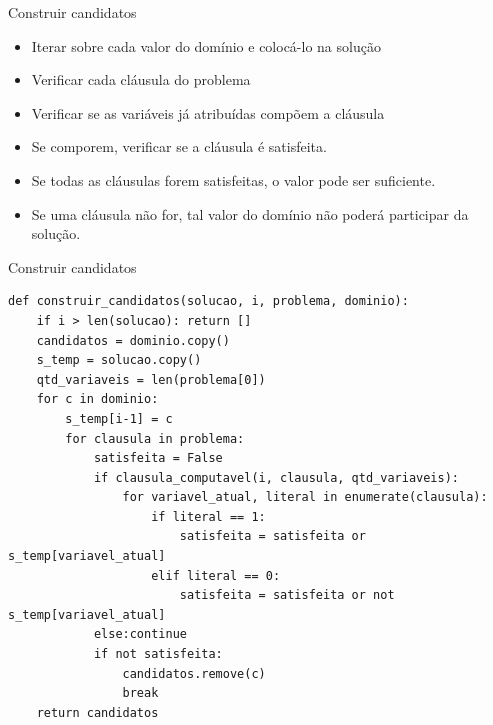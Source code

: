 \documentclass[compress,aspectratio=169]{beamer}
\begin{document}
    \begin{frame}{Construir candidatos}
        \begin{itemize}
            \item Iterar sobre cada valor do domínio e colocá-lo na solução
            \item Verificar cada cláusula do problema
            \item Verificar se as variáveis já atribuídas compõem a cláusula
            \item Se comporem, verificar se a cláusula é satisfeita. 
            \item Se todas as cláusulas forem satisfeitas, o valor pode ser suficiente.
            \item Se uma cláusula não for, tal valor do domínio não poderá participar da solução.
        \end{itemize}
    \end{frame}

    \begin{frame}[fragile]{Construir candidatos}
        \begin{lstlisting}
def construir_candidatos(solucao, i, problema, dominio):
    if i > len(solucao): return []
    candidatos = dominio.copy()
    s_temp = solucao.copy()
    qtd_variaveis = len(problema[0])
    for c in dominio:
        s_temp[i-1] = c
        for clausula in problema:
            satisfeita = False  
            if clausula_computavel(i, clausula, qtd_variaveis):
                for variavel_atual, literal in enumerate(clausula):
                    if literal == 1:
                        satisfeita = satisfeita or s_temp[variavel_atual]
                    elif literal == 0:
                        satisfeita = satisfeita or not s_temp[variavel_atual]
            else:continue
            if not satisfeita:
                candidatos.remove(c)
                break
    return candidatos
        \end{lstlisting}
    \end{frame}
\end{document}
